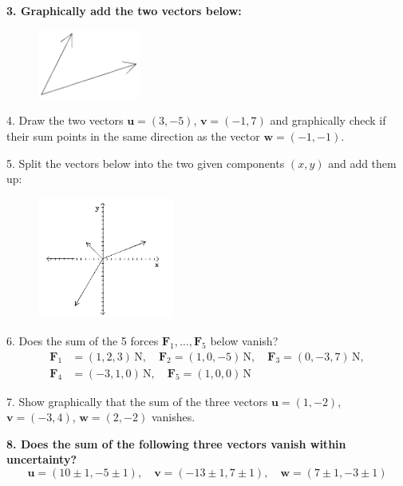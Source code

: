 {\bf{3. Graphically add the two vectors below:}}
\begin{figure}[h]
    \begin{center}
        \includegraphics[width=0.3\textwidth]{./Exp3/pic/image4.png}
    \end{center}
\end{figure}

4. Draw the two vectors $\mathbf{u} = (3,-5)$, $\mathbf{v} = (-1,7)$ and graphically check if their sum points in the same direction as the vector $\mathbf{w} = (-1,-1)$.\myskip

5. Split the vectors below into the two given components $(x,y)$ and add them up:
\begin{figure}[h]
    \begin{center}
        \includegraphics[width=0.4\textwidth]{./Exp3/pic/image5.png}
    \end{center}
\end{figure}

6. Does the sum of the 5 forces $\mathbf{F}_1,\dots,\mathbf{F}_5$ below vanish?
\begin{align*}
    \mathbf{F}_1 &= (1,2,3)\,\mathrm{N},\quad \mathbf{F}_2 = (1,0,-5)\,\mathrm{N},\quad \mathbf{F}_3 = (0,-3,7)\,\mathrm{N}, \\
    \mathbf{F}_4 &= (-3,1,0)\,\mathrm{N},\quad \mathbf{F}_5 = (1,0,0)\,\mathrm{N}
\end{align*}

7. Show graphically that the sum of the three vectors $\mathbf{u} = (1,-2)$, $\mathbf{v} = (-3,4)$, $\mathbf{w} = (2,-2)$ vanishes.\myskip

{\bf{8. Does the sum of the following three vectors vanish within uncertainty?}}
\begin{equation*}
    \mathbf{u} = (10 \pm 1, -5 \pm 1),\quad \mathbf{v} = (-13 \pm 1, 7 \pm 1),\quad \mathbf{w} = (7 \pm 1, -3 \pm 1)
\end{equation*}



